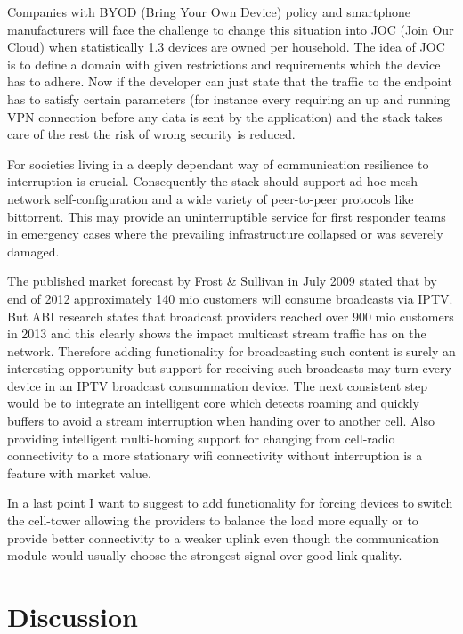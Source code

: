 \documentclass[twocolumn,english]{IEEEtran}
\theoremstyle{plain}
\theoremstyle{plain}
\begin{document}
Companies with BYOD (Bring Your Own Device) policy and smartphone
manufacturers will face the challenge to change this situation into JOC (Join
Our Cloud) when statistically 1.3 devices are owned per
household\cite{gartner:predicts-2014-cognizant-computing}. The idea of JOC is
to define a domain with given restrictions and requirements which the device
has to adhere. Now if the developer can just state that the traffic to the
endpoint has to satisfy certain parameters (for instance every requiring an up
and running VPN connection before any data is sent by the application) and the
stack takes care of the rest the risk of wrong security is reduced.

For societies living in a deeply dependant way of communication resilience to
interruption is crucial. Consequently the stack should support ad-hoc mesh
network self-configuration and a wide variety of peer-to-peer protocols like
bittorrent. This may provide an uninterruptible service for first responder
teams in emergency cases where the prevailing infrastructure collapsed or was
severely damaged.

The published market forecast by Frost \& Sullivan in July
2009\cite{frost:iptv-market} stated that by end of 2012 approximately 140 mio
customers will consume broadcasts via IPTV. But ABI research states that
broadcast providers reached over 900 mio customers in
2013\cite{abi:iptv-marketshare} and this clearly shows the impact multicast
stream traffic has on the network.  Therefore adding functionality for
broadcasting such content is surely an interesting opportunity but support for
receiving such broadcasts may turn every device in an IPTV broadcast
consummation device. The next consistent step would be to integrate an
intelligent core which detects roaming and quickly buffers to avoid a stream
interruption when handing over to another cell. Also providing intelligent
multi-homing support for changing from cell-radio connectivity to a more
stationary wifi connectivity without interruption is a feature with market
value.

In a last point I want to suggest to add functionality for forcing devices to
switch the cell-tower allowing the providers to balance the load more equally
or to provide better connectivity to a weaker uplink even though the
communication module would usually choose the strongest signal over good link
quality.

\section{Discussion}
\end{document}
